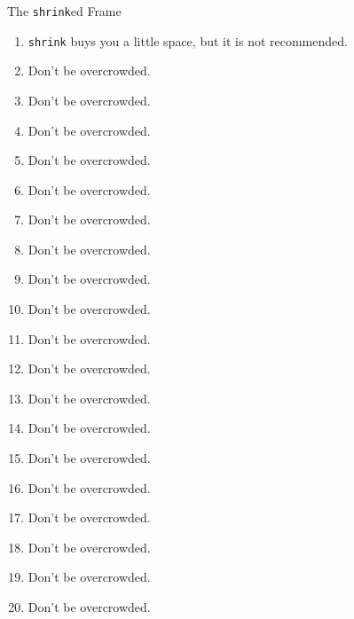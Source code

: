 \documentclass[
        ]{beamer}
\begin{document}
\begin{frame}[shrink]{The \texttt{shrink}ed Frame} %
    \begin{enumerate}
    \item \texttt{shrink} buys you a little space, but it is not recommended.
    \item Don't be overcrowded.
    \item Don't be overcrowded.
    \item Don't be overcrowded.
    \item Don't be overcrowded.

    \item Don't be overcrowded.
    \item Don't be overcrowded.
    \item Don't be overcrowded.
    \item Don't be overcrowded.
    \item Don't be overcrowded.
    
    \item Don't be overcrowded.
    \item Don't be overcrowded.
    \item Don't be overcrowded.
    \item Don't be overcrowded.
    \item Don't be overcrowded.
    
    \item Don't be overcrowded.
    \item Don't be overcrowded.
    \item Don't be overcrowded.
    \item Don't be overcrowded.
    \item Don't be overcrowded.
    \end{enumerate}
\end{frame}
\end{document}
